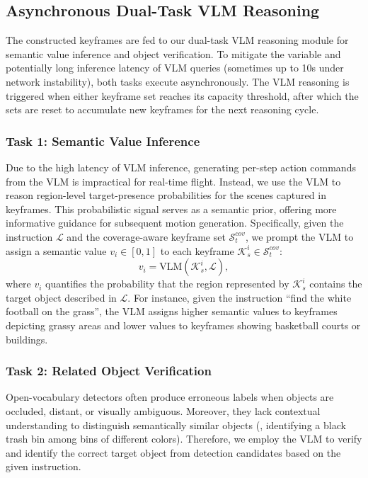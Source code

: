 \subsection{Asynchronous Dual-Task VLM Reasoning}\label{IV-B}
The constructed keyframes are fed to our dual-task VLM reasoning module for 
semantic value inference and object verification. To mitigate the variable and potentially long inference latency of VLM queries (sometimes up to 10s under network instability), both tasks execute asynchronously. The VLM reasoning is triggered when either keyframe set reaches its capacity threshold, after which the sets are reset to accumulate new keyframes for the next reasoning cycle.

\subsubsection{Task 1: Semantic Value Inference} 
Due to the high latency of VLM inference, generating per-step action commands from the VLM is impractical for real-time flight. Instead, we use the VLM to reason region-level target-presence probabilities for the scenes captured in keyframes. This probabilistic signal serves as a semantic prior, offering more informative guidance for subsequent motion generation.
Specifically, given the instruction $\mathcal{L}$ and the coverage-aware keyframe set $\mathcal{S}_t^{cov}$, we prompt the VLM to assign a semantic value $v_i \in [0,1]$ to each keyframe $\mathcal{K}_s^i \in \mathcal{S}_t^{cov}$:
\begin{equation}
    v_i = \text{VLM}(\mathcal{K}_s^i, \mathcal{L}),
\end{equation}
where $v_i$ quantifies the probability that the region represented by $\mathcal{K}_s^i$ contains the target object described in $\mathcal{L}$. For instance, given the instruction ``find the white football on the grass'', the VLM assigns higher semantic values to keyframes depicting grassy areas and lower values to keyframes showing basketball courts or buildings. 

\subsubsection{Task 2: Related Object Verification}
Open-vocabulary detectors often produce erroneous labels when objects are occluded, distant, or visually ambiguous. Moreover, they lack contextual understanding to distinguish semantically similar objects (\eg, identifying a black trash bin among bins of different colors). Therefore, we employ the VLM to verify and identify the correct target object from detection candidates based on the given instruction.

